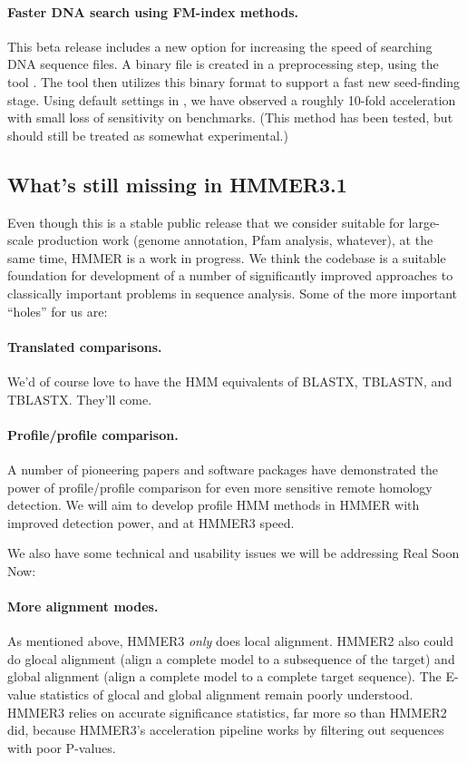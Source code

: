 \paragraph{Faster DNA search using FM-index methods.} This beta release includes a new
option for increasing the speed of searching DNA sequence files. A
binary file is created in a preprocessing step, using the tool
. The tool  then utilizes this binary
format to support a fast new seed-finding stage. Using default
settings in , we have observed a roughly 10-fold
acceleration with small loss of sensitivity on benchmarks. (This
method has been tested, but should still be treated as somewhat
experimental.)


\subsection{What's still missing in HMMER3.1}

Even though this is a stable public release that we consider suitable
for large-scale production work (genome annotation, Pfam analysis,
whatever), at the same time, HMMER is a work in progress. We think the
codebase is a suitable foundation for development of a number of
significantly improved approaches to classically important problems in
sequence analysis. Some of the more important ``holes'' for us are:

\paragraph{Translated comparisons.} We'd of course love to have the HMM
equivalents of BLASTX, TBLASTN, and TBLASTX. They'll come.

\paragraph{Profile/profile comparison.} A number of pioneering papers and
software packages have demonstrated the power of profile/profile
comparison for even more sensitive remote homology detection. We will
aim to develop profile HMM methods in HMMER with improved detection
power, and at HMMER3 speed.

\vspace{2em}

We also have some technical and usability issues we will be addressing
Real Soon Now:

\paragraph{More alignment modes.} As mentioned above, HMMER3 \emph{only} does local
alignment. HMMER2 also could do glocal alignment (align a complete
model to a subsequence of the target) and global alignment (align a
complete model to a complete target sequence). The E-value statistics
of glocal and global alignment remain poorly understood. HMMER3 relies
on accurate significance statistics, far more so than HMMER2 did,
because HMMER3's acceleration pipeline works by filtering out
sequences with poor P-values.

